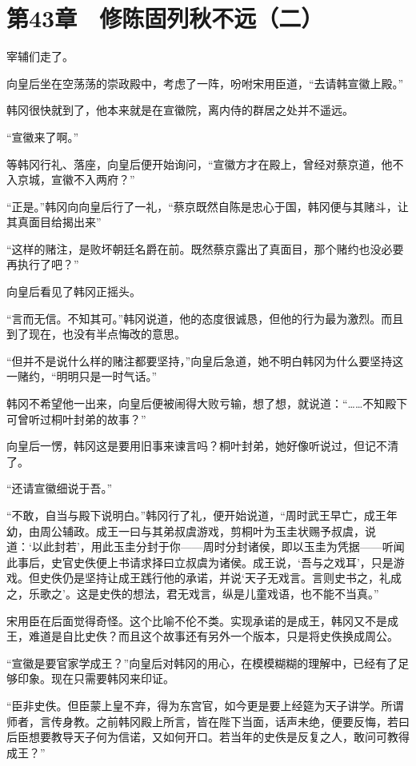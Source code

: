 \section{第43章　修陈固列秋不远（二）}

宰辅们走了。

向皇后坐在空荡荡的崇政殿中，考虑了一阵，吩咐宋用臣道，“去请韩宣徽上殿。”

韩冈很快就到了，他本来就是在宣徽院，离内侍的群居之处并不遥远。

“宣徽来了啊。”

等韩冈行礼、落座，向皇后便开始询问，“宣徽方才在殿上，曾经对蔡京道，他不入京城，宣徽不入两府？”

“正是。”韩冈向向皇后行了一礼，“蔡京既然自陈是忠心于国，韩冈便与其赌斗，让其真面目给揭出来”

“这样的赌注，是败坏朝廷名爵在前。既然蔡京露出了真面目，那个赌约也没必要再执行了吧？”

向皇后看见了韩冈正摇头。

“言而无信。不知其可。”韩冈说道，他的态度很诚恳，但他的行为最为激烈。而且到了现在，也没有半点悔改的意思。

“但并不是说什么样的赌注都要坚持，”向皇后急道，她不明白韩冈为什么要坚持这一赌约，“明明只是一时气话。”

韩冈不希望他一出来，向皇后便被闹得大败亏输，想了想，就说道：“……不知殿下可曾听过桐叶封弟的故事？”

向皇后一愣，韩冈这是要用旧事来谏言吗？桐叶封弟，她好像听说过，但记不清了。

“还请宣徽细说于吾。”

“不敢，自当与殿下说明白。”韩冈行了礼，便开始说道，“周时武王早亡，成王年幼，由周公辅政。成王一曰与其弟叔虞游戏，剪桐叶为玉圭状赐予叔虞，说道：‘以此封若’，用此玉圭分封于你——周时分封诸侯，即以玉圭为凭据——听闻此事后，史官史佚便上书请求择曰立叔虞为诸侯。成王说，‘吾与之戏耳’，只是游戏。但史佚仍是坚持让成王践行他的承诺，并说‘天子无戏言。言则史书之，礼成之，乐歌之’。这是史佚的想法，君无戏言，纵是儿童戏语，也不能不当真。”

宋用臣在后面觉得奇怪。这个比喻不伦不类。实现承诺的是成王，韩冈又不是成王，难道是自比史佚？而且这个故事还有另外一个版本，只是将史佚换成周公。

“宣徽是要官家学成王？”向皇后对韩冈的用心，在模模糊糊的理解中，已经有了足够印象。现在只需要韩冈来印证。

“臣非史佚。但臣蒙上皇不弃，得为东宫官，如今更是要上经筵为天子讲学。所谓师者，言传身教。之前韩冈殿上所言，皆在陛下当面，话声未绝，便要反悔，若曰后臣想要教导天子何为信诺，又如何开口。若当年的史佚是反复之人，敢问可教得成王？”

